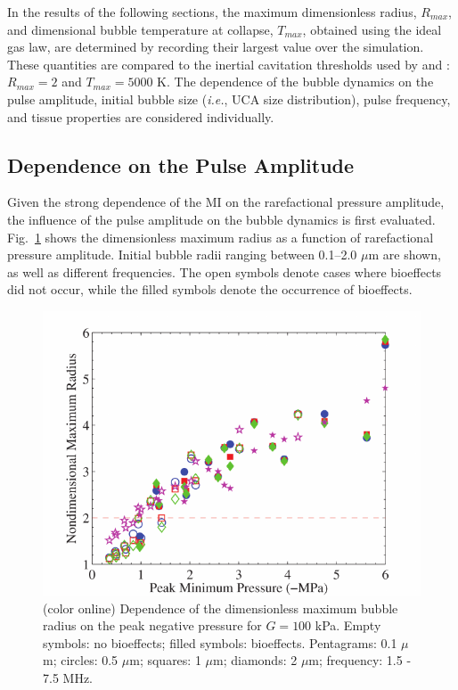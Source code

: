 In the results of the following sections, the maximum dimensionless radius,
$R_{max}$, and dimensional bubble temperature at collapse, $T_{max}$, obtained
using the ideal gas law, are determined by recording their largest
value over the simulation. These quantities are compared to the
inertial cavitation thresholds used by \cite{Apfel1991} and
\cite{Yang2005}: $R_{max}=2$ and $T_{max}=5000$ K. The dependence
of the bubble dynamics on the pulse amplitude, initial
bubble size (\emph{i.e.}, UCA size distribution), 
pulse frequency, and tissue properties are considered
individually. 



\subsection{Dependence on the Pulse Amplitude}

Given the strong dependence of the MI on the rarefactional pressure
amplitude, the influence of the pulse amplitude on the bubble dynamics
is first evaluated. Fig.~\ref{figure:amplitude} shows the dimensionless
maximum radius as a function of rarefactional pressure
amplitude. Initial bubble radii ranging between 0.1--2.0 $\mu$m are
shown, as well as different frequencies. The open symbols denote
cases where bioeffects did not occur, while the filled symbols denote
the occurrence of bioeffects.

\begin{figure}[t]
  \includegraphics[width=\columnwidth]{./figs/bubble_figs/rstarmax_pm}
  \caption{(color online) Dependence of the dimensionless maximum bubble radius on
    the peak negative pressure for $G=100$ kPa.  Empty symbols: no
    bioeffects; filled symbols: bioeffects. Pentagrams: 0.1 $\mu$m; circles:
    0.5 $\mu$m; squares: 1 $\mu$m; diamonds: 2 $\mu$m; frequency: 1.5 - 7.5 MHz. }
  \label{figure:amplitude}
\end{figure}

